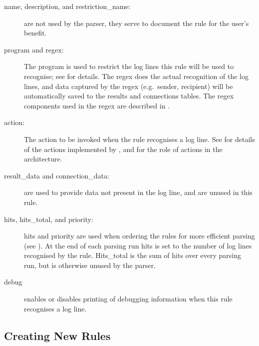 \begin{description}

    \item [name, description, and restriction\_name:] are not used by the
        parser, they serve to document the rule for the user's benefit.

    \item [program and regex:] The program is used to restrict the log
        lines this rule will be used to recognise; see  for details.  The regex does the
        actual recognition of the log lines, and data captured by the regex
        (e.g.\ sender, recipient) will be automatically saved to the
        results and connections tables.  The regex components used in the
        regex are described in .

    \item [action:] The action to be invoked when the rule recognises a log
        line.  See  for
        details of the actions implemented by \parsername{}, and
         for the role of actions in the
        architecture.

    \item [result\_data and connection\_data:] are used to provide data not
        present in the log line, and are unused in this rule.

    \item [hits, hits\_total, and priority:] hits and priority are used
        when ordering the rules for more efficient parsing (see
        ).  At the end of each
        parsing run hits is set to the number of log lines recognised by
        the rule.  Hits\_total is the sum of hits over every parsing run,
        but is otherwise unused by the parser.

    \item [debug] enables or disables printing of debugging information
        when this rule recognises a log line.

\end{description}

\subsection{Creating New Rules}

\label{creating new rules in implementation}

